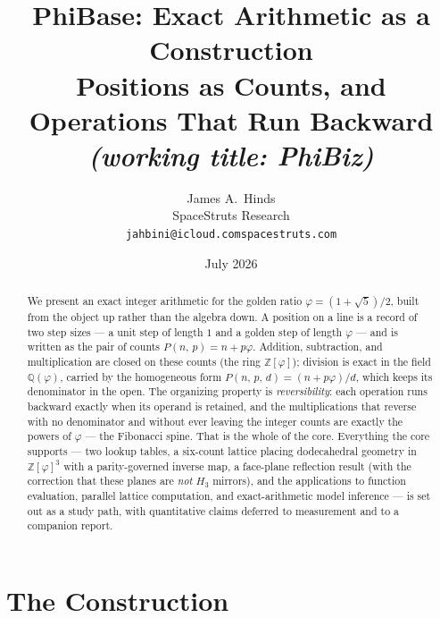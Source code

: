 \documentclass[11pt]{article}
\theoremstyle{definition}
\theoremstyle{remark}
\newcommand{\Zphi}{\mathbb{Z}[\varphi]}
\newcommand{\Qphi}{\mathbb{Q}(\varphi)}
\newcommand{\Pb}[2]{P(#1,\,#2)}
\newcommand{\Pbd}[3]{P(#1,\,#2,\,#3)}
\begin{document}
\title{%
  \textbf{PhiBase: Exact Arithmetic as a Construction}\\[6pt]
  \large Positions as Counts, and Operations That Run Backward\\[4pt]
  \normalsize\textit{(working title: PhiBiz)}}
\author{%
  James A.~Hinds\\
  SpaceStruts Research\\[4pt]
  \small\texttt{jahbini@icloud.com\quad spacestruts.com}}
\date{July 2026}
\maketitle
\thispagestyle{fancy}

\begin{abstract}
We present an exact integer arithmetic for the golden ratio
$\varphi=(1+\sqrt5)/2$, built from the object up rather than the algebra down.
A position on a line is a record of two step sizes --- a unit step of length
$1$ and a golden step of length $\varphi$ --- and is written as the pair of
counts $\Pb{n}{p}=n+p\varphi$. Addition, subtraction, and multiplication are
closed on these counts (the ring $\Zphi$); division is exact in the field
$\Qphi$, carried by the homogeneous form $\Pbd{n}{p}{d}=(n+p\varphi)/d$, which
keeps its denominator in the open. The organizing property is
\emph{reversibility}: each operation runs backward exactly when its operand is
retained, and the multiplications that reverse with no denominator and without
ever leaving the integer counts are exactly the powers of $\varphi$ --- the
Fibonacci spine. That is the whole of the core. Everything the core supports ---
two lookup tables, a six-count lattice placing dodecahedral geometry in
$\Zphi^3$ with a parity-governed inverse map, a face-plane reflection result
(with the correction that these planes are \emph{not} $H_3$ mirrors), and the
applications to function evaluation, parallel lattice computation, and
exact-arithmetic model inference --- is set out as a study path, with
quantitative claims deferred to measurement and to a companion report.
\end{abstract}

\tableofcontents
\newpage

\section{The Construction}
\label{sec:construction}
\end{document}
